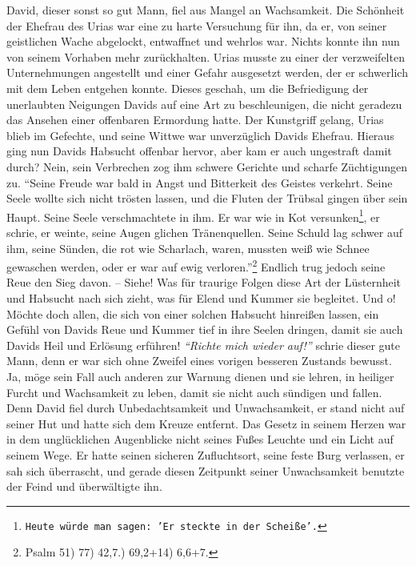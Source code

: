 David, dieser sonst so gut Mann, fiel aus Mangel an
Wachsamkeit. Die Schönheit
der Ehefrau des Urias war eine zu harte
Versuchung für ihn, da er, von seiner
geistlichen Wache abgelockt, entwaffnet und wehrlos war. Nichts konnte ihn nun
von seinem Vorhaben mehr zurückhalten. Urias musste zu
einer der verzweifelten
Unternehmungen angestellt und einer Gefahr ausgesetzt werden, der er schwerlich
mit dem Leben entgehen konnte. Dieses geschah, um die Befriedigung der
unerlaubten Neigungen Davids auf eine Art zu beschleunigen, die nicht geradezu
das Ansehen einer offenbaren Ermordung hatte. Der Kunstgriff gelang, Urias blieb
im Gefechte, und seine Wittwe war unverzüglich Davids Ehefrau. Hieraus ging nun
Davids Habsucht offenbar hervor, aber kam er auch ungestraft
damit durch? Nein,
sein Verbrechen zog ihm schwere Gerichte und scharfe Züchtigungen zu.
"`Seine
Freude war bald in Angst und Bitterkeit des Geistes verkehrt. Seine Seele
wollte sich nicht trösten lassen, und die Fluten der Trübsal gingen über sein
Haupt. Seine Seele verschmachtete in ihm. Er war wie in Kot
versunken\footnote{\texttt{Heute würde man sagen: 'Er steckte in der Scheiße'.}},
er schrie, er weinte,
seine Augen glichen Tränenquellen. Seine Schuld lag schwer auf ihm, seine
Sünden, die rot wie Scharlach, waren, mussten weiß wie Schnee gewaschen
werden, oder er war auf ewig verloren."'\footnote{Psalm 51) 77) 42,7.) 69,2+14) 6,6+7.}
Endlich trug jedoch seine Reue den Sieg davon. -- Siehe! Was für
traurige Folgen diese Art der Lüsternheit und Habsucht nach
sich zieht, was für
Elend und Kummer sie begleitet. Und o! Möchte doch allen, die sich von einer
solchen Habsucht hinreißen lassen, ein Gefühl von Davids Reue und Kummer tief in
ihre Seelen dringen, damit sie auch Davids Heil und Erlösung erführen!
\textit{"`Richte
mich wieder auf!"'} schrie dieser gute Mann, denn er war sich ohne Zweifel eines
vorigen besseren Zustands bewusst. Ja, möge sein Fall auch anderen zur Warnung
dienen und sie lehren, in heiliger Furcht und Wachsamkeit
zu leben, damit sie
nicht auch sündigen und fallen. Denn David fiel durch Unbedachtsamkeit und
Unwachsamkeit, er stand nicht auf seiner Hut und hatte sich dem Kreuze
entfernt. Das Gesetz in seinem Herzen war in dem
unglücklichen Augenblicke nicht
seines Fußes Leuchte und ein Licht auf seinem Wege. Er hatte seinen sicheren
Zufluchtsort, seine feste Burg verlassen, er sah sich überrascht, und gerade
diesen Zeitpunkt seiner Unwachsamkeit benutzte der Feind und überwältigte ihn.

